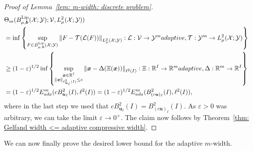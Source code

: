 \documentclass[namedate,webpdf]{ima-authoring-template-blank}
\newcommand*{\Lip}{\mathrm{Lip}}  %
\newcommand*{\nm}[1]{{\left\|#1\right \|}}
\numberwithin{counter}{section}
\numberwithin{equation}{section}
\theoremstyle{plain}
\theoremstyle{definition}
\newcommand*{\cL}{\mathcal{L}}
\newcommand*{\cT}{\mathcal{T}}
\newcommand*{\cV}{\mathcal{V}}
\newcommand*{\cX}{\mathcal{X}}
\newcommand*{\cY}{\mathcal{Y}}
\newcommand*{\bbR}{\mathbb{R}}
\theoremstyle{thmstyletwo}
\begin{document}
\begin{proof}[Proof of Lemma~\ref{lem: m-width: discrete problem}]
    \begin{align*}
        &\Theta_m(B_{\mu, \bm{b}}^{\Lip}(\cX; \cY); \cV, L_{\mu}^2(\cX; \cY)) \\
        &= \inf\left\{
        \sup_{F \in B_{\mu, \bm{b}}^{\Lip}(\cX; \cY)} \nm{F - \cT(\cL(F))}_{L_{\mu}^2(\cX; \cY)}: \cL: \cV \to \cY^m \textup{ adaptive, } \cT: \cY^m \to L_{\mu}^2(\cX; \cY)\right\} \\
        &\geq (1-\varepsilon)^{1/2} \inf\left\{
        \sup_{\substack{\bm{x} \in \bbR^I \\ \nm{\bm{x}}_{\ell_{\bm{u}_I}^2(I)} \leq c}} \nm{\bm{x} - \Delta(\Xi(\bm{x}))}_{\ell^2(I)}: \Xi: \bbR^I \to \bbR^m \textup{ adaptive, } \Delta: \bbR^m \to \bbR^I \right\} \\
        &= (1 - \varepsilon)^{1/2} E_{\textup{ada}}^m(c B_{\bm{u}_I}^2(I), \ell^2(I)) = (1 - \varepsilon)^{1/2} E_{\textup{ada}}^m(B_{(c\bm{u})_I}^2(I), \ell^2(I)),
    \end{align*}
    where in the last step we used that \(c B_{\bm{u}_I}^2(I) = B_{(c\bm{u})_I}^2(I)\).
    As \(\varepsilon > 0\) was arbitrary, we can take the limit \(\varepsilon\to 0^+\).
    The claim now follows by Theorem~\ref{thm: Gelfand width <= adaptive compressive width}.
\end{proof}

We can now finally prove the desired lower bound for the adaptive \(m\)-width.
\end{document}
